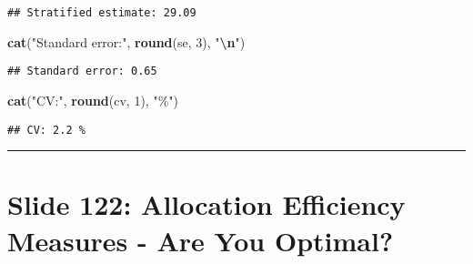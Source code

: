 \documentclass[
]{article}
\newenvironment{Shaded}{\begin{snugshade}}{\end{snugshade}}
\newcommand{\DecValTok}[1]{\textcolor[rgb]{0.00,0.00,0.81}{#1}}
\newcommand{\FunctionTok}[1]{\textcolor[rgb]{0.13,0.29,0.53}{\textbf{#1}}}
\newcommand{\NormalTok}[1]{#1}
\newcommand{\OtherTok}[1]{\textcolor[rgb]{0.56,0.35,0.01}{#1}}
\newcommand{\SpecialCharTok}[1]{\textcolor[rgb]{0.81,0.36,0.00}{\textbf{#1}}}
\newcommand{\StringTok}[1]{\textcolor[rgb]{0.31,0.60,0.02}{#1}}
\begin{document}
\begin{Shaded}
\end{Shaded}

\begin{verbatim}
## Stratified estimate: 29.09
\end{verbatim}

\begin{Shaded}
\begin{Highlighting}[]
\FunctionTok{cat}\NormalTok{(}\StringTok{"Standard error:"}\NormalTok{, }\FunctionTok{round}\NormalTok{(se, }\DecValTok{3}\NormalTok{), }\StringTok{"}\SpecialCharTok{\textbackslash{}n}\StringTok{"}\NormalTok{)}
\end{Highlighting}
\end{Shaded}

\begin{verbatim}
## Standard error: 0.65
\end{verbatim}

\begin{Shaded}
\begin{Highlighting}[]
\FunctionTok{cat}\NormalTok{(}\StringTok{"CV:"}\NormalTok{, }\FunctionTok{round}\NormalTok{(cv, }\DecValTok{1}\NormalTok{), }\StringTok{"\%"}\NormalTok{)}
\end{Highlighting}
\end{Shaded}

\begin{verbatim}
## CV: 2.2 %
\end{verbatim}

\begin{center}\rule{0.5\linewidth}{0.5pt}\end{center}

\section{Slide 122: Allocation Efficiency Measures - Are You
Optimal?}\label{slide-122-allocation-efficiency-measures---are-you-optimal}
\end{document}
